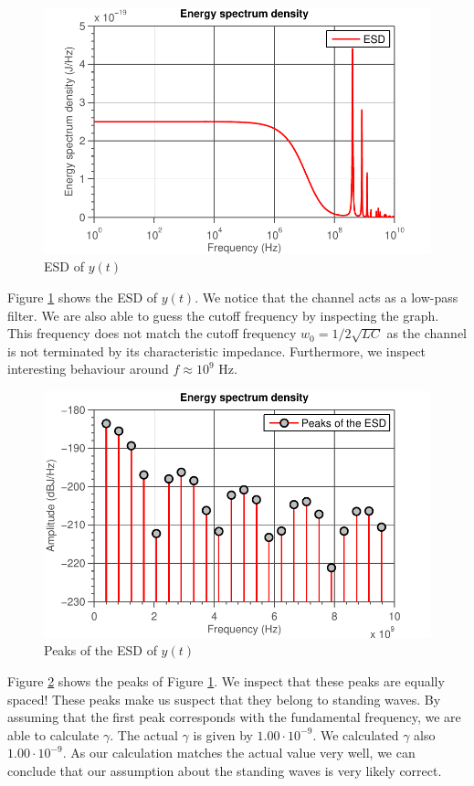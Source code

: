 \documentclass[11pt,titlepage]{report}
\begin{document}
\begin{figure}[H]
	\centering
	\includegraphics[width=.85\linewidth]{resource/esd.pdf}
	\caption{ESD of $y(t)$}
	\label{fig:ass-1-esd}
\end{figure}

Figure \ref{fig:ass-1-esd} shows the ESD of $y(t)$. We notice that the channel acts as a low-pass filter. We are also able to guess the cutoff frequency by inspecting the graph. This frequency does not match the cutoff frequency $w_0=1/2\sqrt{LC}$ as the channel is not terminated by its characteristic impedance. Furthermore, we inspect interesting behaviour around $f\approx 10^9 \text{ Hz}$.

\begin{figure}[H]
	\centering
	\includegraphics[width=.85\linewidth]{resource/peaks.pdf}
	\caption{Peaks of the ESD of $y(t)$}
	\label{fig:ass-1-peaks}
\end{figure}

Figure \ref{fig:ass-1-peaks} shows the peaks of Figure \ref{fig:ass-1-esd}. We inspect that these peaks are equally spaced! These peaks make us suspect that they belong to standing waves. By assuming that the first peak corresponds with the fundamental frequency, we are able to calculate $\gamma$. The actual $\gamma$ is given by $1.00 \cdot 10^{-9}$. We calculated $\gamma$ also $1.00 \cdot 10^{-9}$. As our calculation matches the actual value very well, we can conclude that our assumption about the standing waves is very likely correct.
\end{document}
